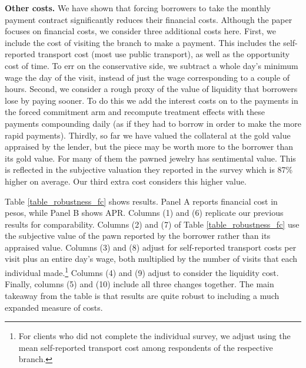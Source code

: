 \documentclass[ecta,nameyear,final]{econsocart}
\begin{document}
\noindent \textbf{Other costs.} We have shown that forcing borrowers to take the monthly payment contract significantly reduces their financial costs. Although the paper focuses on financial costs, we consider three additional costs here. First, we include the cost of visiting the branch to make a payment. This includes the self-reported transport cost (most use public transport), as well as the opportunity cost of time. To err on the conservative side, we subtract a whole day's minimum wage the day of the visit, instead of just the wage corresponding to a couple of hours. Second, we consider a rough proxy of the value of liquidity that borrowers lose by paying sooner. To do this we add the interest costs on to the payments in the forced commitment arm and recompute treatment effects with these payments compounding daily (as if they had to borrow in order to make the more rapid payments). Thirdly, so far we have valued the collateral at the gold value appraised by the lender, but the piece may be worth more to the borrower than its gold value.  For many of them the pawned jewelry has sentimental value. This is reflected in the subjective valuation they reported in the survey which is 87\% higher on average. Our third extra cost considers this higher value.

Table \ref{table_robustness_fc} shows results. Panel A reports financial cost in pesos, while Panel B shows APR. Columns (1) and (6) replicate our previous results for comparability. Columns (2) and (7) of Table \ref{table_robustness_fc} use the subjective value of the pawn reported by the borrower rather than its appraised value. Columns (3) and (8) adjust for self-reported transport costs per visit plus an entire day's wage, both multiplied by the number of visits that each individual made.\footnote{For clients who did not complete the individual survey, we adjust using the mean self-reported transport cost among respondents of the respective branch.} Columns (4) and (9) adjust to consider the liquidity cost. Finally, columns (5) and (10) include all three changes together. The main takeaway from the table is that results are quite robust to including a much expanded measure of costs. 
\end{document}
